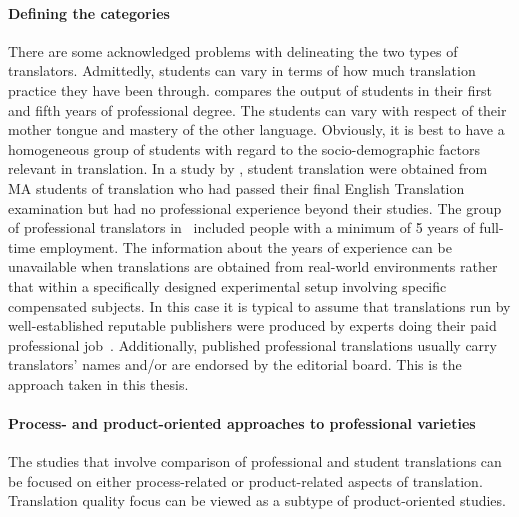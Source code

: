 \paragraph{Defining the categories} There are some acknowledged problems with delineating the two types of translators. Admittedly, students can vary in terms of how much translation practice they have been through. \citet{Tirkkonen1990} compares the output of students in their first and fifth years of professional degree. The students can vary with respect of their mother tongue and mastery of the other language. Obviously, it is best to have a homogeneous group of students with regard to the socio-demographic factors relevant in translation. 
In a study by \citet{Daems2017}, student translation were obtained from MA students of translation who had passed their final English Translation examination but had no professional experience beyond their studies. 
The group of professional translators in~\citet{Daems2017} included people with a minimum of 5 years of full-time employment.
The information about the years of experience can be unavailable when translations are obtained from real-world environments rather that within a specifically designed experimental setup involving specific compensated subjects. In this case it is typical to assume that translations run by well-established reputable publishers were produced by experts doing their paid professional job~\cite[see][for example]{Redelinghuys2015}. Additionally, published professional translations usually carry translators' names and/or are endorsed by the editorial board. This is the approach taken in this thesis.

\paragraph{Process- and product-oriented approaches to professional varieties} The studies that involve comparison of professional and student translations can be focused on either process-related or product-related aspects of translation. Translation quality focus can be viewed as a subtype of product-oriented studies.

